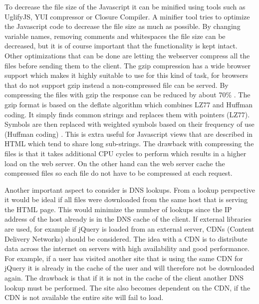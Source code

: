 To decrease the file size of the Javascript it can be minified using tools such as UglifyJS, YUI compressor or Closure Compiler. A minifier tool tries to optimize the Javascript code to decrease the file size as much as possible. By changing variable names, removing comments and whitespaces the file size can be decreased, but it is of course important that the functionality is kept intact. Other optimizations that can be done are letting the webserver compress all the files before sending them to the client. The gzip compression has a wide browser support which makes it highly suitable to use for this kind of task, for browsers that do not support gzip instead a non-compressed file can be served. By compressing the files with gzip the response can be reduced by about 70\% \cite{gzip_reduce_size}. The gzip format is based on the deflate algorithm which combines LZ77 and Huffman coding. It simply finds common strings and replaces them with pointers (LZ77). Symbols are then replaced with weighted symbols based on their frequency of use (Huffman coding) \cite{deflate}. This is extra useful for Javascript views that are described in HTML which tend to share long sub-strings. The drawback with compressing the files is that it takes additional CPU cycles to perform which results in a higher load on the web server. On the other hand can the web server cache the compressed files so each file do not have to be compressed at each request.

Another important aspect to consider is DNS lookups. From a lookup perspective it would be ideal if all files were downloaded from the same host that is serving the HTML page. This would minimize the number of lookups since the IP address of the host already is in the DNS cache of the client. If external libraries are used, for example if jQuery is loaded from an external server, CDNs (Content Delivery Networks) should be considered. The idea with a CDN is to distribute data across the internet on servers with high availability and good performance. For example, if a user has visited another site that is using the same CDN for jQuery it is already in the cache of the user and will therefore not be downloaded again. The drawback is that if it is not in the cache of the client another DNS lookup must be performed. The site also becomes dependent on the CDN, if the CDN is not available the entire site will fail to load.

